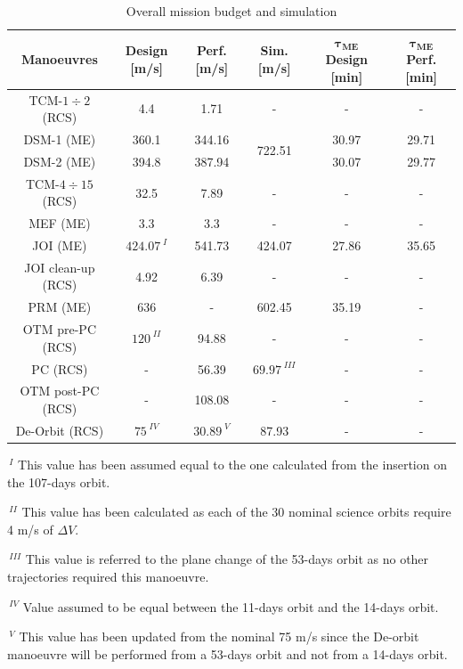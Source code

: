 \begin{table}[H]
    \renewcommand{\arraystretch}{1.3}
    \centering
    \begin{tabular}{|c|c|c|c|c|c|}
        \hline
        \textbf{Manoeuvres} & \textbf{Design} [m/s] & \textbf{Perf.} [m/s] & \textbf{Sim.} [m/s] & \textbf{$\boldsymbol{\tau_{ME}}$ Design} [min] & \textbf{$\boldsymbol{\tau_{ME}}$ Perf.} [min]  \\
        \hline
        TCM-$1\div2$ (RCS) \cite{junno_inner} & 4.4 & 1.71 & - & - & - \\
        \hline 
        \multicolumn{1}{|c|}{DSM-1 (ME) \cite{junno_inner}} & \multicolumn{1}{c|}{360.1} & \multicolumn{1}{c|}{344.16} & \multirow{2}{*}{722.51} & \multicolumn{1}{c|}{30.97} & \multicolumn{1}{c|}{29.71} \\
        \cline{1-3}
        \cline{5-6}
        \multicolumn{1}{|c|}{DSM-2 (ME) \cite{junno_inner}} & \multicolumn{1}{c|}{394.8} & \multicolumn{1}{c|}{387.94} & & \multicolumn{1}{c|}{30.07} & \multicolumn{1}{c|}{29.77} \\
        \hline
        TCM-$4\div15$ (RCS) \cite{junno_inner} & 32.5 & 7.89 & - & - & - \\
        \hline
        MEF (ME) \cite{junno_inner} & 3.3 & 3.3 & - & - & - \\
        \hline
        JOI (ME) \cite{otm} & $424.07^{\;I}$ & 541.73 & 424.07 & 27.86 & 35.65 \\
        \hline
        JOI clean-up (RCS) \cite{otm} & 4.92 & 6.39 & - & - & - \\
        \hline
        PRM (ME) \cite{otm} & 636 & - & 602.45 & 35.19 & - \\
        \hline
        OTM pre-PC (RCS) \cite{nasa_otm} & $120^{\;II}$ & 94.88 & - & - & - \\
        \hline 
        PC (RCS) & - & 56.39 & $69.97^{\;III}$ & - & - \\
        \hline
        OTM post-PC (RCS) & - & 108.08 & - & - & - \\
        \hline
        De-Orbit (RCS) \cite{spaceflight101} & $75^{\;IV}$ & $30.89^{\;V} $& 87.93 & - & -\\
        \hline
    \end{tabular}
    \caption{Overall mission budget and simulation}
    \label{table:deltav}
\end{table}

$\,^{I}$ This value has been assumed equal to the one calculated from the insertion on the 107-days orbit. 

$\,^{II}$ This value has been calculated as each of the 30 nominal science orbits require 4 m/s of $\Delta V$.

$\,^{III}$ This value is referred to the plane change of the 53-days orbit as no other trajectories required this manoeuvre. 

$\,^{IV}$ Value assumed to be equal between the 11-days orbit and the 14-days orbit. 

$\,^{V}$ This value has been updated from the nominal 75 m/s since the De-orbit manoeuvre will be performed from a 53-days orbit and not from a 14-days orbit. 


